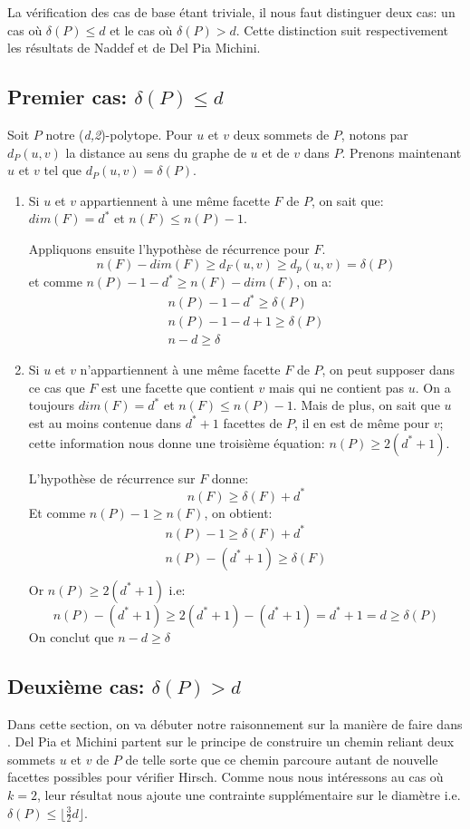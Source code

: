\documentclass[11pt]{article}
\begin{document}
La vérification des cas de base étant triviale, il nous faut distinguer deux cas: un cas où $\delta(P)\leq{d}$ et le cas où $\delta(P)>d$. Cette distinction suit respectivement les résultats de Naddef et de Del Pia Michini.

\subsection{Premier cas: $\delta(P)\leq{d}$}
Soit $P$ notre (\textit{d,2})-polytope.
Pour $u$ et $v$ deux sommets de $P$, notons par $d_P(u,v)$ la distance au sens du graphe de $u$ et de $v$ dans $P$. Prenons maintenant $u$ et $v$ tel que $d_P(u,v) = \delta(P)$.

\begin{enumerate}[i]
\item Si $u$ et $v$ appartiennent à une même facette $F$ de $P$, on sait que: $dim(F)=d^*$ et $n(F)\leq{n(P)-1}$.

Appliquons ensuite l'hypothèse de récurrence pour $F$.
$$
	n(F)-dim(F)\geq{d_F(u,v)}\geq{d_p(u,v)}=\delta(P)
$$
et comme $n(P)-1-d^*\geq{n(F)-dim(F)}$, on a:
$$
	\begin{array}{c}
		n(P)-1-d^*\geq\delta(P)\\
		n(P)-1-d+1\geq\delta(P)\\
		n-d\geq\delta
	\end{array}	
$$

\item Si $u$ et $v$ n'appartiennent à une même facette $F$ de $P$, on peut supposer dans ce cas que $F$ est une facette que contient $v$ mais qui ne contient pas $u$. On a toujours $dim(F)=d^*$ et $n(F)\leq{n(P)-1}$. Mais de plus, on sait que $u$ est au moins contenue dans $d^*+1$ facettes de $P$, il en est de même pour $v$; cette information nous donne une troisième équation: $n(P)\geq{2(d^*+1)}$. 

L'hypothèse de récurrence sur $F$ donne:
$$
	n(F)\geq{\delta(F)+d^*}
$$
Et comme $n(P)-1\geq{n(F)}$, on obtient:
$$
	\begin{array}{c}
		n(P)-1\geq\delta(F)+d^*\\
		n(P)-(d^*+1)\geq\delta(F)\\
	\end{array}
$$
Or $n(P)\geq{2(d^*+1)}$ i.e:
$$
	n(P)-(d^*+1)\geq{2(d^*+1)}-(d^*+1)=d^*+1=d\geq{\delta(P)}
$$
On conclut que $n - d \geq{\delta}$
\end{enumerate}

\subsection{Deuxième cas: $\delta(P)>d$}
Dans cette section, on va débuter notre raisonnement sur la manière de faire dans \cite{del2016diameter}. Del Pia et Michini partent sur le principe de construire un chemin reliant deux sommets $u$ et $v$ de $P$ de telle sorte que ce chemin parcoure autant de nouvelle facettes possibles pour vérifier Hirsch. Comme nous nous intéressons au cas où $k=2$, leur résultat nous ajoute une contrainte supplémentaire sur le diamètre i.e. $\delta(P)\leq{\lfloor{\frac{3}{2}}d\rfloor}$.
\end{document}
